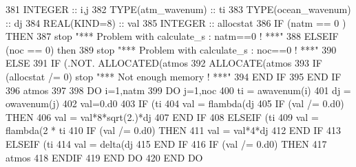 \begin{DoxyCode}
381     \textcolor{keywordtype}{INTEGER} :: i,j
382     \textcolor{keywordtype}{TYPE}(atm\_wavenum) :: ti
383     \textcolor{keywordtype}{TYPE}(ocean\_wavenum) :: dj
384     \textcolor{keywordtype}{REAL(KIND=8)} :: val
385     \textcolor{keywordtype}{INTEGER} :: allocstat 
386     \textcolor{keywordflow}{IF} (natm == 0 ) \textcolor{keywordflow}{THEN}
387        stop \textcolor{stringliteral}{"*** Problem with calculate\_s : natm==0 ! ***"}
388     \textcolor{keywordflow}{ELSEIF} (noc == 0) \textcolor{keywordflow}{then}
389        stop \textcolor{stringliteral}{"*** Problem with calculate\_s : noc==0 ! ***"}
390     \textcolor{keywordflow}{ELSE}
391        \textcolor{keywordflow}{IF} (.NOT. \textcolor{keyword}{ALLOCATED}(atmos%
392           \textcolor{keyword}{ALLOCATE}(atmos%
393           \textcolor{keywordflow}{IF} (allocstat /= 0) stop \textcolor{stringliteral}{"*** Not enough memory ! ***"}
394 \textcolor{keywordflow}{       END IF}
395 \textcolor{keywordflow}{    END IF}
396     atmos%
397 
398     \textcolor{keywordflow}{DO} i=1,natm
399        \textcolor{keywordflow}{DO} j=1,noc
400           ti = awavenum(i)
401           dj = owavenum(j)
402           val=0.d0
403           \textcolor{keywordflow}{IF} (ti%
404              val = flambda(dj%
405              \textcolor{keywordflow}{IF} (val /= 0.d0) \textcolor{keywordflow}{THEN}
406                 val = val*8*sqrt(2.)*dj%
407 \textcolor{keywordflow}{             END IF}
408           \textcolor{keywordflow}{ELSEIF} (ti%
409              val = flambda(2 * ti%
410              \textcolor{keywordflow}{IF} (val /= 0.d0) \textcolor{keywordflow}{THEN}
411                 val = val*4*dj%
412 \textcolor{keywordflow}{             END IF}
413           \textcolor{keywordflow}{ELSEIF} (ti%
414              val = delta(dj%
415 \textcolor{keywordflow}{          END IF}
416           \textcolor{keywordflow}{IF} (val /= 0.d0) \textcolor{keywordflow}{THEN}
417              atmos%
418 \textcolor{keywordflow}{          ENDIF}
419 \textcolor{keywordflow}{       END DO}
420 \textcolor{keywordflow}{    END DO}
\end{DoxyCode}
